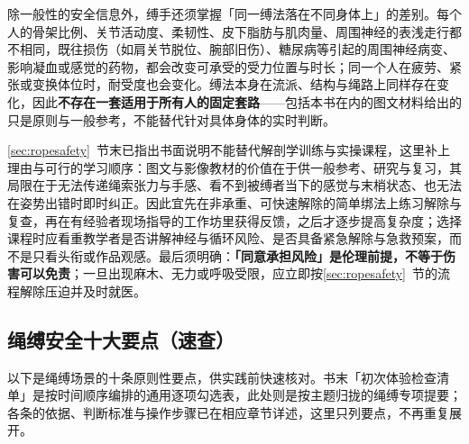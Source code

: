 \documentclass[12pt,UTF8]{ctexbook}
\begin{document}
除一般性的安全信息外，缚手还须掌握「同一缚法落在不同身体上」的差别。每个人的骨架比例、关节活动度、柔韧性、皮下脂肪与肌肉量、周围神经的表浅走行都不相同，既往损伤（如肩关节脱位、腕部旧伤）、糖尿病等引起的周围神经病变、影响凝血或感觉的药物，都会改变可承受的受力位置与时长；同一个人在疲劳、紧张或变换体位时，耐受度也会变化。缚法本身在流派、结构与绳路上同样存在变化，因此\textbf{不存在一套适用于所有人的固定套路}——包括本书在内的图文材料给出的只是原则与一般参考，不能替代针对具体身体的实时判断。

\ref{sec:ropesafety}~节末已指出书面说明不能替代解剖学训练与实操课程，这里补上理由与可行的学习顺序：图文与影像教材的价值在于供一般参考、研究与复习，其局限在于无法传递绳索张力与手感、看不到被缚者当下的感觉与末梢状态、也无法在姿势出错时即时纠正。因此宜先在非承重、可快速解除的简单绑法上练习解除与复查，再在有经验者现场指导的工作坊里获得反馈，之后才逐步提高复杂度；选择课程时应看重教学者是否讲解神经与循环风险、是否具备紧急解除与急救预案，而不是只看头衔或作品观感。最后须明确：\textbf{「同意承担风险」是伦理前提，不等于伤害可以免责}；一旦出现麻木、无力或呼吸受限，应立即按\ref{sec:ropesafety}~节的流程解除压迫并及时就医。

\subsection{绳缚安全十大要点（速查）}\label{sec:ropeten}

以下是绳缚场景的十条原则性要点，供实践前快速核对。书末「初次体验检查清单」是按时间顺序编排的通用逐项勾选表，此处则是按主题归拢的绳缚专项提要；各条的依据、判断标准与操作步骤已在相应章节详述，这里只列要点，不再重复展开。
\end{document}
